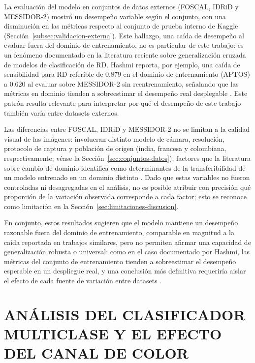La evaluación del modelo en conjuntos de datos externos (FOSCAL, IDRiD y MESSIDOR-2)
mostró un desempeño variable según el conjunto, con una disminución en las métricas
respecto al conjunto de prueba interno de Kaggle (Sección~\ref{subsec:validacion-externa}).
Este hallazgo, una caída de desempeño al evaluar fuera del dominio de entrenamiento, no
es particular de este trabajo: es un fenómeno documentado en la literatura reciente sobre
generalización cruzada de modelos de clasificación de RD. Hashmi reporta, por ejemplo,
una caída de sensibilidad para RD referible de 0.879 en el dominio de entrenamiento
(APTOS) a 0.620 al evaluar sobre MESSIDOR-2 sin reentrenamiento, señalando que las
métricas en dominio tienden a sobreestimar el desempeño real desplegable
. Este patrón resulta relevante para interpretar por
qué el desempeño de este trabajo también varía entre datasets externos.

Las diferencias entre FOSCAL, IDRiD y MESSIDOR-2 no se limitan a la calidad visual de las
imágenes: involucran distinto modelo de cámara, resolución, protocolo de captura y
población de origen (india, francesa y colombiana, respectivamente; véase la
Sección~\ref{sec:conjuntos-datos}), factores que la literatura sobre cambio de dominio
identifica como determinantes de la transferibilidad de un modelo entrenado en un dominio
distinto . Dado que estas variables no fueron
controladas ni desagregadas en el análisis, no es posible atribuir con precisión qué
proporción de la variación observada corresponde a cada factor; esto se reconoce como
limitación en la Sección~\ref{sec:limitaciones-discusion}.

En conjunto, estos resultados sugieren que el modelo mantiene un desempeño razonable
fuera del dominio de entrenamiento, comparable en magnitud a la caída reportada en
trabajos similares, pero no permiten afirmar una capacidad de generalización robusta o
universal: como en el caso documentado por Hashmi, las métricas del conjunto de
entrenamiento tienden a sobreestimar el desempeño esperable en un despliegue real, y una
conclusión más definitiva requeriría aislar el efecto de cada fuente de variación entre
datasets .

\section{ANÁLISIS DEL CLASIFICADOR MULTICLASE Y EL EFECTO DEL CANAL DE COLOR}

